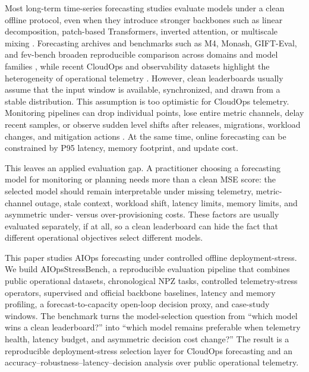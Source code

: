 \documentclass[conference]{IEEEtran}
\begin{document}
Most long-term time-series forecasting studies evaluate models under a clean offline protocol, even when they introduce stronger backbones such as linear decomposition, patch-based Transformers, inverted attention, or multiscale mixing \cite{dlinear,patchtst,itransformer,timemixer}. Forecasting archives and benchmarks such as M4, Monash, GIFT-Eval, and fev-bench broaden reproducible comparison across domains and model families \cite{m4,monash,gifteval,fevbench}, while recent CloudOps and observability datasets highlight the heterogeneity of operational telemetry \cite{cloudops,boom,alibaba,gaia,netman}. However, clean leaderboards usually assume that the input window is available, synchronized, and drawn from a stable distribution. This assumption is too optimistic for CloudOps telemetry. Monitoring pipelines can drop individual points, lose entire metric channels, delay recent samples, or observe sudden level shifts after releases, migrations, workload changes, and mitigation actions \cite{gcm_missing,gcm_latency,prom_staleness}. At the same time, online forecasting can be constrained by P95 latency, memory footprint, and update cost.

This leaves an applied evaluation gap. A practitioner choosing a forecasting model for monitoring or planning needs more than a clean MSE score: the selected model should remain interpretable under missing telemetry, metric-channel outage, stale context, workload shift, latency limits, memory limits, and asymmetric under- versus over-provisioning costs. These factors are usually evaluated separately, if at all, so a clean leaderboard can hide the fact that different operational objectives select different models.

This paper studies AIOps forecasting under controlled offline deployment-stress. We build AIOpsStressBench, a reproducible evaluation pipeline that combines public operational datasets, chronological NPZ tasks, controlled telemetry-stress operators, supervised and official backbone baselines, latency and memory profiling, a forecast-to-capacity open-loop decision proxy, and case-study windows. The benchmark turns the model-selection question from ``which model wins a clean leaderboard?'' into ``which model remains preferable when telemetry health, latency budget, and asymmetric decision cost change?'' The result is a reproducible deployment-stress selection layer for CloudOps forecasting and an accuracy--robustness--latency--decision analysis over public operational telemetry.
\end{document}
